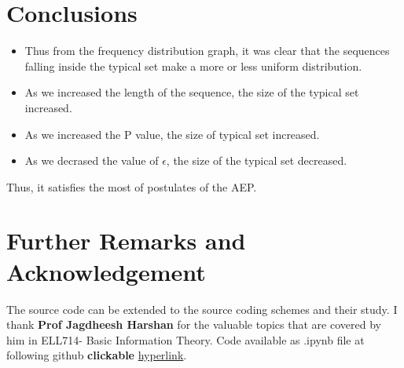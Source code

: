 \documentclass[11pt]{article}
\begin{document}

\pagebreak

\section{Conclusions}
\begin{itemize}
    \item 
Thus from the frequency distribution graph, it was clear that the sequences falling inside the typical set make a more or less uniform distribution.
\item As we increased the length of the sequence, the size of the typical set increased.
\item As we increased the P value, the size of typical set increased.
\item As we decrased the value of \( \epsilon \), the size of the typical set decreased. 
\end{itemize}

Thus, it satisfies the most of postulates of the AEP. 

\section{Further Remarks and Acknowledgement}
The source code can be extended to the source coding schemes and their study. I thank \textbf{Prof Jagdheesh Harshan} for the valuable topics that are covered by him in ELL714- Basic Information Theory. Code available as .ipynb file at following github \textbf{clickable}  
\href{https://github.com/bhattg/Asymptotic_Equipartition_Property}{hyperlink}. 
\end{document}

